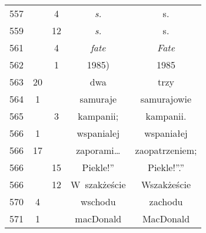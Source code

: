 \documentclass[a4paper,11pt]{article}
\begin{document}
\begin{center}
\begin{tabular}{|c|c|c|c|c|}
    557 & &  4 & \textit{s.} & s. \\
    559 & & 12 & \textit{s.} & s. \\
    561 & &  4 & \textit{fate} & \textit{Fate} \\
    562 & &  1 & 1985) & 1985 \\
    563 & 20 & & dwa & trzy \\
    564 &  1 & & samuraje & samurajowie \\
    565 & &  3 & kampanii; & kampanii. \\
    566 &  1 & & wspanialej & wspaniałej \\
    566 & 17 & & zaporami\ldots & zaopatrzeniem; \\
    566 & & 15 & Piekle!” & Piekle!”.” \\
    566 & & 12 & W~szakżeście& Wszakżeście \\
    570 &  4 & & wschodu & zachodu \\
    571 &  1 & & macDonald & MacDonald \\
    \hline
  \end{tabular}






\end{center}
\end{document}
